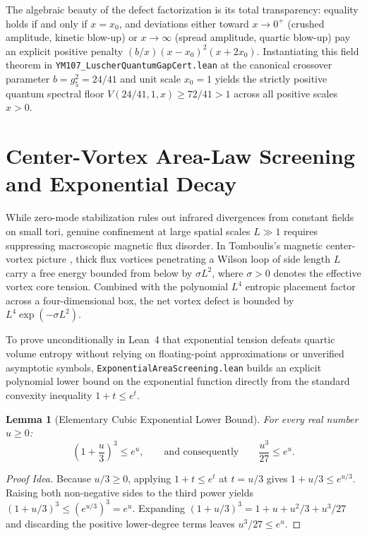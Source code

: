 \documentclass[11pt,a4paper]{article}
\newtheorem{lemma}[theorem]{Lemma}
\begin{document}
The algebraic beauty of the defect factorization is its total transparency: equality holds if and only if $x = x_0$, and deviations either toward $x \to 0^+$ (crushed amplitude, kinetic blow-up) or $x \to \infty$ (spread amplitude, quartic blow-up) pay an explicit positive penalty $(b/x)(x - x_0)^2(x + 2x_0)$. Instantiating this field theorem in \texttt{YM107\_LuscherQuantumGapCert.lean} at the canonical crossover parameter $b = g_5^2 = 24/41$ and unit scale $x_0 = 1$ yields the strictly positive quantum spectral floor $V(24/41, 1, x) \ge 72/41 > 1$ across all positive scales $x > 0$.

\section{Center-Vortex Area-Law Screening and Exponential Decay}
While zero-mode stabilization rules out infrared divergences from constant fields on small tori, genuine confinement at large spatial scales $L \gg 1$ requires suppressing macroscopic magnetic flux disorder. In Tomboulis's magnetic center-vortex picture \cite{tHooft1978,Tomboulis1977,Tomboulis1981}, thick flux vortices penetrating a Wilson loop of side length $L$ carry a free energy bounded from below by $\sigma L^2$, where $\sigma > 0$ denotes the effective vortex core tension. Combined with the polynomial $L^4$ entropic placement factor across a four-dimensional box, the net vortex defect is bounded by $L^4 \exp(-\sigma L^2)$.

To prove unconditionally in Lean~4 that exponential tension defeats quartic volume entropy without relying on floating-point approximations or unverified asymptotic symbols, \texttt{ExponentialAreaScreening.lean} builds an explicit polynomial lower bound on the exponential function directly from the standard convexity inequality $1 + t \le e^t$.

\begin{lemma}[Elementary Cubic Exponential Lower Bound]
For every real number $u \ge 0$:
\begin{equation}
\left(1 + \frac{u}{3}\right)^3 \le e^u, \qquad \text{and consequently} \qquad \frac{u^3}{27} \le e^u.
\end{equation}
\end{lemma}

\begin{proof}[Proof Idea]
Because $u/3 \ge 0$, applying $1 + t \le e^t$ at $t = u/3$ gives $1 + u/3 \le e^{u/3}$. Raising both non-negative sides to the third power yields $(1 + u/3)^3 \le (e^{u/3})^3 = e^u$. Expanding $(1 + u/3)^3 = 1 + u + u^2/3 + u^3/27$ and discarding the positive lower-degree terms leaves $u^3/27 \le e^u$.
\end{proof}
\end{document}
